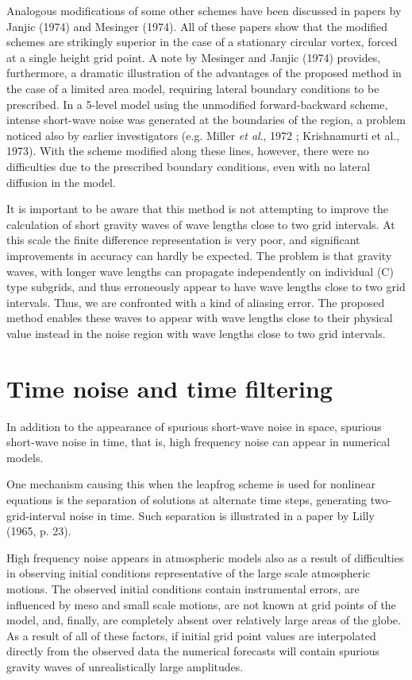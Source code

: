Analogous modifications of some other schemes have been discussed in
papers by Janjic (1974) and Mesinger (1974). All of these papers show
that the modified schemes are strikingly superior in the case of a
stationary circular vortex, forced at a single height grid point. A note
by Mesinger and Janjic (1974) provides, furthermore, a dramatic
illustration of the advantages of the proposed method in the case of a
limited area model, requiring lateral boundary conditions to be
prescribed. In a 5-level model using the unmodified forward-backward
scheme, intense short-wave noise was generated at the boundaries of the
region, a problem noticed also by earlier investigators (e.g. Miller
\emph{et al}., 1972 ; Krishnamurti et al., 1973). With the scheme
modified along these lines, however, there were no difficulties due to
the prescribed boundary conditions, even with no lateral diffusion in
the model.

It is important to be aware that this method is not attempting to
improve the calculation of short gravity waves of wave lengths close to
two grid intervals. At this scale the finite difference representation
is very poor, and significant improvements in accuracy can hardly be
expected. The problem is that gravity waves, with longer wave lengths
can propagate independently on individual (C) type subgrids, and thus
erroneously appear to have wave lengths close to two grid intervals.
Thus, we are confronted with a kind of aliasing error. The proposed
method enables these waves to appear with wave lengths close to their
physical value instead in the noise region with wave lengths close to
two grid intervals.

\section{Time noise and time filtering}\label{sec:time-noise-and-time-filtering}

In addition to the appearance of spurious short-wave noise in space,
spurious short-wave noise in time, that is, high frequency noise can
appear in numerical models.

One mechanism causing this when the leapfrog scheme is used for
nonlinear equations is the separation of solutions at alternate time
steps, generating two-grid-interval noise in time. Such separation is
illustrated in a paper by Lilly (1965, p. 23).

High frequency noise appears in atmospheric models also as a result of
difficulties in observing initial conditions representative of the
large scale atmospheric motions. The observed initial conditions contain
instrumental errors, are influenced by meso and small scale motions,
are not known at grid points of the model, and, finally, are completely
absent over relatively large areas of the globe. As a result of all of
these factors, if initial grid point values are interpolated directly
from the observed data the numerical forecasts will contain spurious
gravity waves of unrealistically large amplitudes.

